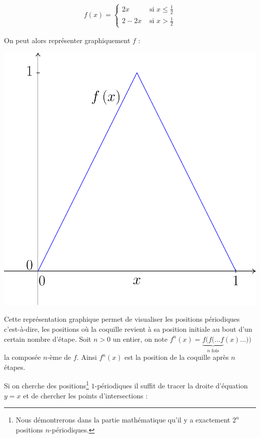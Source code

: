 \documentclass[a4paper,french,12pt]{article}
\begin{document}
\vspace*{-0.4cm}

\begin{align*}
f\left(x\right)=\begin{cases}2x &\text{ si }x\leqslant\frac{1}{2}\\2-2x &\text{ si }x>\frac{1}{2}\end{cases}
\end{align*}

On peut alors représenter graphiquement $f$ :

\begin{center}
\includegraphics[scale=0.45]{../TeXGraph/Pdf/graphique_etape_1.pdf}
\end{center}
Cette représentation graphique permet de visualiser les positions périodiques c'est-à-dire, les positions où la coquille revient à sa position initiale au bout d'un certain nombre d'étape. Soit $n>0$ un entier, on note $f^n\left(x\right)=\underbrace{f(f(\ldots f}_\text{$n$ fois}(x)\ldots))$ la composée $n$-ème de $f$. Ainsi $f^n\left(x\right)$ est la position de la coquille après $n$ étapes.


Si on cherche des positions\footnote{Nous démontrerons dans la partie mathématique qu'il y a exactement $2^n$ positions $n$-périodiques.} $1$-périodiques il suffit de tracer la droite d'équation $y=x$ et de chercher les points d'intersections :
\end{document}
